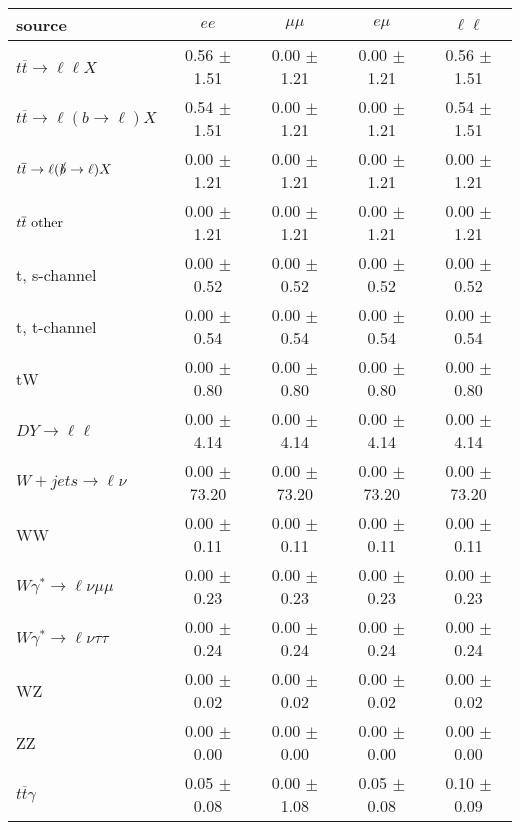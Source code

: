 \begin{tabular}{l|cccc} \hline\hline
source & $ee$ & $\mu\mu$ & $e\mu$ & $\ell\ell $ \\
\hline
$t\overline{t} \rightarrow \ell \ell X$ &  0.56 $\pm$  1.51 &  0.00 $\pm$  1.21 &  0.00 $\pm$  1.21 &  0.56 $\pm$  1.51 \\
$t\overline{t} \rightarrow \ell (b \rightarrow \ell) X$ &  0.54 $\pm$  1.51 &  0.00 $\pm$  1.21 &  0.00 $\pm$  1.21 &  0.54 $\pm$  1.51 \\
$t\overline{t} \rightarrow \ell (\slashed b \rightarrow \ell) X$ &  0.00 $\pm$  1.21 &  0.00 $\pm$  1.21 &  0.00 $\pm$  1.21 &  0.00 $\pm$  1.21 \\
        $t\overline{t}\ \rm{other}$ &  0.00 $\pm$  1.21 &  0.00 $\pm$  1.21 &  0.00 $\pm$  1.21 &  0.00 $\pm$  1.21 \\
\hline
                       t, s-channel &  0.00 $\pm$  0.52 &  0.00 $\pm$  0.52 &  0.00 $\pm$  0.52 &  0.00 $\pm$  0.52 \\
                       t, t-channel &  0.00 $\pm$  0.54 &  0.00 $\pm$  0.54 &  0.00 $\pm$  0.54 &  0.00 $\pm$  0.54 \\
                                 tW &  0.00 $\pm$  0.80 &  0.00 $\pm$  0.80 &  0.00 $\pm$  0.80 &  0.00 $\pm$  0.80 \\
\hline
         $DY \rightarrow \ell \ell$ &  0.00 $\pm$  4.14 &  0.00 $\pm$  4.14 &  0.00 $\pm$  4.14 &  0.00 $\pm$  4.14 \\
      $W+jets \rightarrow \ell \nu$ &  0.00 $\pm$ 73.20 &  0.00 $\pm$ 73.20 &  0.00 $\pm$ 73.20 &  0.00 $\pm$ 73.20 \\
                                 WW &  0.00 $\pm$  0.11 &  0.00 $\pm$  0.11 &  0.00 $\pm$  0.11 &  0.00 $\pm$  0.11 \\
\hline
$W\gamma^{*} \rightarrow \ell \nu \mu\mu$ &  0.00 $\pm$  0.23 &  0.00 $\pm$  0.23 &  0.00 $\pm$  0.23 &  0.00 $\pm$  0.23 \\
$W\gamma^{*} \rightarrow \ell \nu \tau\tau$ &  0.00 $\pm$  0.24 &  0.00 $\pm$  0.24 &  0.00 $\pm$  0.24 &  0.00 $\pm$  0.24 \\
                                 WZ &  0.00 $\pm$  0.02 &  0.00 $\pm$  0.02 &  0.00 $\pm$  0.02 &  0.00 $\pm$  0.02 \\
                                 ZZ &  0.00 $\pm$  0.00 &  0.00 $\pm$  0.00 &  0.00 $\pm$  0.00 &  0.00 $\pm$  0.00 \\
\hline
              $t\overline{t}\gamma$ &  0.05 $\pm$  0.08 &  0.00 $\pm$  1.08 &  0.05 $\pm$  0.08 &  0.10 $\pm$  0.09 \\

\end{tabular}
